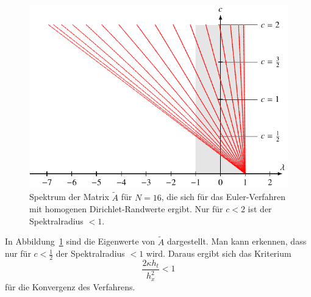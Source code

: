 \begin{figure}
\centering
\includegraphics{chapters/70-pde/images/explizitspektrum.pdf}
\caption{Spektrum der Matrix $\tilde{A}$ für $N=16$,
die sich für das Euler-Verfahren mit
%
homogenen Dirichlet-Randwerte ergibt.
Nur für $c<2$ ist der Spektralradius $<1$.
\label{buch:pde:waerme:explizitspektrum}}
\end{figure}
In Abbildung~\ref{buch:pde:waerme:explizitspektrum} sind die Eigenwerte
von $\tilde{A}$ dargestellt.
Man kann erkennen, dass nur für $c<\frac12$ der Spektralradius $<1$
wird.
%
Daraus ergibt sich das Kriterium
\[
\frac{2\kappa h_t}{h_x^2} < 1
\]
für die Konvergenz des Verfahrens.

